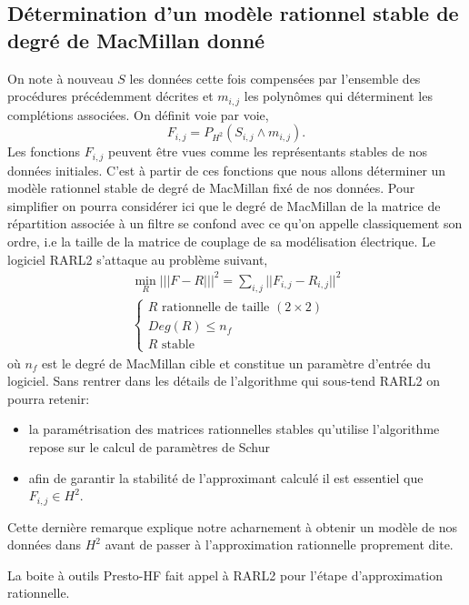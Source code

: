 \documentclass[12]{article}
\def\prest{Presto-HF\xspace}
\newcommand{\HH}{H^2}
\begin{document}
\subsection{D\'etermination d'un mod\`ele rationnel stable de degr\'e de
  MacMillan donn\'e}

On note \`a nouveau $S$ les donn\'ees cette fois compens\'ees par
l'ensemble des proc\'edures pr\'ec\'edemment d\'ecrites et $m_{i,j}$ les
polyn\^omes qui d\'eterminent les compl\'etions associ\'ees. 
On d\'efinit voie par voie,
$$
F_{i,j}=P_{\HH}(S_{i,j} \wedge m_{i,j}).$$
Les fonctions $F_{i,j}$ peuvent \^etre vues comme les repr\'esentants
stables de nos donn\'ees initiales. C'est \`a partir de ces fonctions
que nous allons d\'eterminer un mod\`ele rationnel stable de degr\'e de
MacMillan fix\'e de nos donn\'ees. Pour simplifier on pourra consid\'erer ici que le
degr\'e de MacMillan de la matrice de r\'epartition associ\'ee \`a un
filtre se confond avec ce qu'on appelle classiquement son ordre, i.e la
taille de la matrice de couplage de sa mod\'elisation \'electrique. Le logiciel RARL2 s'attaque au probl\`eme suivant,
\begin{gather}
\label{RARL2:optim}
\min_R |||F-R|||^2=\sum_{i,j} ||F_{i,j}-R_{i,j}||^2 \\
\begin{cases}
\nonumber
R \mbox{ rationnelle de taille }(2 \times 2) \\
Deg(R) \leq n_f \\
R \mbox{ stable }
\end{cases} 
\end{gather}   
o\`u $n_f$ est le degr\'e de MacMillan cible et constitue un param\`etre 
d'entr\'ee du logiciel. Sans rentrer dans les d\'etails de l'algorithme
qui sous-tend RARL2 on pourra retenir:
\begin{itemize}
\item la param\'etrisation des matrices rationnelles stables qu'utilise
  l'algorithme repose sur le calcul de param\`etres de Schur
\item afin de garantir la stabilit\'e de l'approximant calcul\'e il est
  essentiel que $F_{i,j} \in \HH$.
\end{itemize} 
Cette derni\`ere remarque explique notre \og acharnement \fg \`a obtenir un
mod\`ele de nos donn\'ees dans $H^2$ avant de passer \`a l'approximation 
rationnelle proprement dite. 

La boite \`a outils \prest fait appel \`a RARL2 pour l'\'etape
d'approximation rationnelle.  
\end{document}

